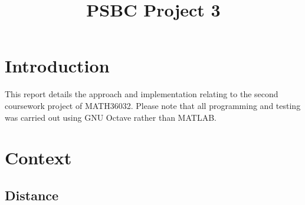 \documentclass[10pt]{article}
\title{PSBC Project 3}
\newcommand{\inlinemaketitle}{{\let\newpage\relax\maketitle}}
\begin{document}
\inlinemaketitle
\section{Introduction}



This report details the approach and implementation relating to the second coursework project of MATH36032. Please note that all programming and testing was carried out using GNU Octave rather than MATLAB.

\section{Context}



\begin{appendices}

\section{Distance}\label{ap:distance}

\end{appendices}
\end{document}
